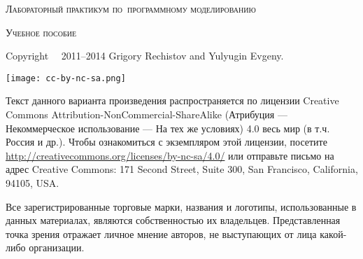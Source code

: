 
\thispagestyle{empty}

\begin{center}
	\huge\textsc{Лабораторный практикум по~программному моделированию}\par
	
	\bigskip
	
	\Large\textsc{Учебное пособие}
\end{center}


\newlength{\centeroffset}
\setlength{\centeroffset}{-0.5\oddsidemargin}
\addtolength{\centeroffset}{0.5\evensidemargin}

\noindent\hspace*{\centeroffset}
\pagebreak

\thispagestyle{empty}
\begin{small} 
Copyright \textcopyright~~2011--2014 Grigory Rechistov and Yulyugin Evgeny.

\begin{center}
	\texttt{[image: cc-by-nc-sa.png]}
\end{center}

Текст данного варианта произведения распространяется по лицензии Creative Commons At\-tri\-bu\-tion-Non\-Com\-mer\-cial-Share\-Alike (Атрибуция — Некоммерческое использование — На тех же условиях) 4.0 весь мир (в т.ч. Россия и др.). Чтобы ознакомиться с экземпляром этой лицензии, посетите \url{http://creativecommons.org/licenses/by-nc-sa/4.0/} или отправьте письмо на адрес Creative Commons: 171 Second Street, Suite 300, San Francisco, California, 94105, USA. 

Все зарегистрированные торговые марки, названия и логотипы, использованные в данных материалах, являются собственностью их владельцев. Представленная точка зрения отражает личное мнение авторов, не выступающих от лица какой-либо организации.
\end{small}
